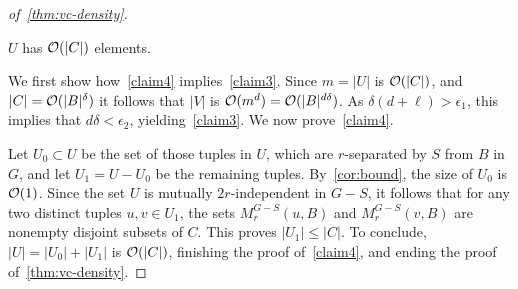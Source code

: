 \begin{proof}[of~\cref{thm:vc-density}]
  
  
  \begin{claim}\label{claim4}
	    	 $U$ has  $\mathcal{O}(|C|)$ elements.
  \end{claim}
    We first show how~\cref{claim4} implies~\cref{claim3}.
  Since $m=|U|$ is $\mathcal{O}(|C|)$,
  and $|C|=\mathcal{O}(|B|^\delta)$
  it follows that $|V|$ is $\mathcal{O}(m^d)=\mathcal{O}(|B|^{d\delta})$. As $\delta(d+\ell)>\epsilon_1$, this implies that $d\delta<\epsilon_2$,  yielding~\cref{claim3}.
  We now prove~\cref{claim4}.

\medskip
  Let $U_0\subset U$ be the set of 
  those tuples in $U$, which are $r$-separated by $S$ from $B$ in $G$,
  and let $U_1=U-U_0$ be the remaining  tuples.
  By~\cref{cor:bound}, the size of $U_0$ is $\mathcal{O}(1)$.  
 Since the set $U$ is mutually $2r$-independent in $G-S$, it follows that for any two distinct tuples $u,v\in U_1$,
 the sets $M_r^{G-S}(u,B)$ and $M_r^{G-S}(v,B)$ are nonempty disjoint subsets of $C$. This proves $|U_1|\le |C|$.
%
    To conclude, $|U|=|U_0|+|U_1|$ is $\mathcal{O}(|C|)$, finishing the proof of~\cref{claim4}, and ending the proof of~\cref{thm:vc-density}.  \end{proof}
